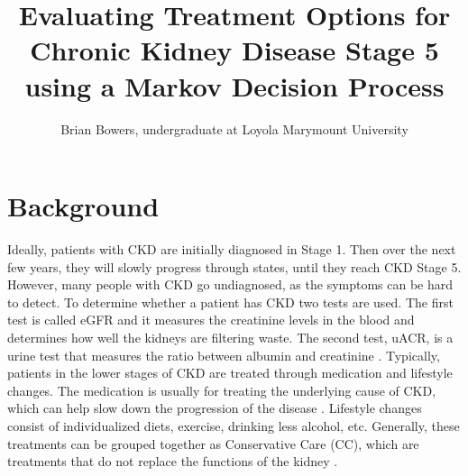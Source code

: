 \documentclass[10pt,twocolumn]{article}
\begin{document}
\title{Evaluating Treatment Options for Chronic Kidney Disease Stage 5 using a Markov Decision Process}
\author{
Brian Bowers, undergraduate at Loyola Marymount University}



\section{Background}
Ideally, patients with CKD are initially diagnosed in Stage 1. Then over the next few years, they will slowly progress through states, until they reach CKD Stage 5. However, many people with CKD go undiagnosed, as the symptoms can be hard to detect. To determine whether a patient has CKD two tests are used. The first test is called eGFR and it measures the creatinine levels in the blood and determines how well the kidneys are filtering waste. The second test, uACR, is a urine test that measures the ratio between albumin and creatinine \cite{Chronic}. Typically, patients in the lower stages of CKD are treated through medication and lifestyle changes. The medication is usually for treating the underlying cause of CKD, which can help slow down the progression of the disease \cite{Prescribing}. Lifestyle changes consist of individualized diets, exercise, drinking less alcohol, etc. Generally, these treatments can be grouped together as Conservative Care (CC), which are treatments that do not replace the functions of the kidney \cite{Treatments}.
\end{document}
